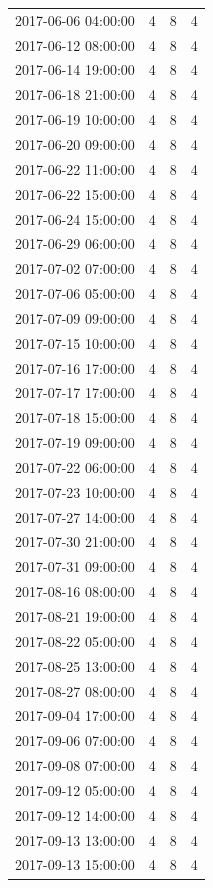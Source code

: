 \begin{tabular}{lrrr}
2017-06-06 04:00:00 & 4 & 8 & 4 \\
2017-06-12 08:00:00 & 4 & 8 & 4 \\
2017-06-14 19:00:00 & 4 & 8 & 4 \\
2017-06-18 21:00:00 & 4 & 8 & 4 \\
2017-06-19 10:00:00 & 4 & 8 & 4 \\
2017-06-20 09:00:00 & 4 & 8 & 4 \\
2017-06-22 11:00:00 & 4 & 8 & 4 \\
2017-06-22 15:00:00 & 4 & 8 & 4 \\
2017-06-24 15:00:00 & 4 & 8 & 4 \\
2017-06-29 06:00:00 & 4 & 8 & 4 \\
2017-07-02 07:00:00 & 4 & 8 & 4 \\
2017-07-06 05:00:00 & 4 & 8 & 4 \\
2017-07-09 09:00:00 & 4 & 8 & 4 \\
2017-07-15 10:00:00 & 4 & 8 & 4 \\
2017-07-16 17:00:00 & 4 & 8 & 4 \\
2017-07-17 17:00:00 & 4 & 8 & 4 \\
2017-07-18 15:00:00 & 4 & 8 & 4 \\
2017-07-19 09:00:00 & 4 & 8 & 4 \\
2017-07-22 06:00:00 & 4 & 8 & 4 \\
2017-07-23 10:00:00 & 4 & 8 & 4 \\
2017-07-27 14:00:00 & 4 & 8 & 4 \\
2017-07-30 21:00:00 & 4 & 8 & 4 \\
2017-07-31 09:00:00 & 4 & 8 & 4 \\
2017-08-16 08:00:00 & 4 & 8 & 4 \\
2017-08-21 19:00:00 & 4 & 8 & 4 \\
2017-08-22 05:00:00 & 4 & 8 & 4 \\
2017-08-25 13:00:00 & 4 & 8 & 4 \\
2017-08-27 08:00:00 & 4 & 8 & 4 \\
2017-09-04 17:00:00 & 4 & 8 & 4 \\
2017-09-06 07:00:00 & 4 & 8 & 4 \\
2017-09-08 07:00:00 & 4 & 8 & 4 \\
2017-09-12 05:00:00 & 4 & 8 & 4 \\
2017-09-12 14:00:00 & 4 & 8 & 4 \\
2017-09-13 13:00:00 & 4 & 8 & 4 \\
2017-09-13 15:00:00 & 4 & 8 & 4 \\

\end{tabular}
